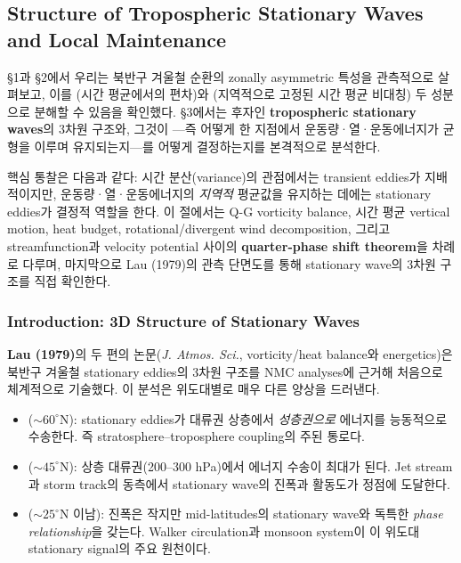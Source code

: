 \subsection{Structure of Tropospheric Stationary Waves and Local Maintenance}\label{subsec:ch06_stationary}

§1과 §2에서 우리는 북반구 겨울철 순환의 zonally asymmetric 특성을 관측적으로 살펴보고,
이를 (시간 평균에서의 편차)와 (지역적으로 고정된 시간 평균 비대칭)
두 성분으로 분해할 수 있음을 확인했다.
§3에서는 후자인 \textbf{tropospheric stationary waves}의 3차원 구조와,
그것이 ---즉 어떻게 한 지점에서 운동량·열·운동에너지가 균형을 이루며 유지되는지---를
어떻게 결정하는지를 본격적으로 분석한다.

핵심 통찰은 다음과 같다: 시간 분산(variance)의 관점에서는 transient eddies가 지배적이지만,
운동량·열·운동에너지의 \emph{지역적} 평균값을 유지하는 데에는 stationary eddies가 결정적 역할을 한다.
이 절에서는 Q-G vorticity balance, 시간 평균 vertical motion, heat budget,
rotational/divergent wind decomposition, 그리고 streamfunction과 velocity potential 사이의
\textbf{quarter-phase shift theorem}을 차례로 다루며,
마지막으로 Lau (1979)의 관측 단면도를 통해 stationary wave의 3차원 구조를 직접 확인한다.


\subsubsection{Introduction: 3D Structure of Stationary Waves}

\textbf{Lau (1979)}의 두 편의 논문(\textit{J. Atmos. Sci.}, vorticity/heat balance와 energetics)은
북반구 겨울철 stationary eddies의 3차원 구조를 NMC analyses에 근거해 처음으로 체계적으로 기술했다.
이 분석은 위도대별로 매우 다른 양상을 드러낸다.

\begin{itemize}
  \item {} ($\sim 60^\circ$N): stationary eddies가 대류권 상층에서 \emph{성층권으로}
        에너지를 능동적으로 수송한다. 즉 stratosphere--troposphere coupling의 주된 통로다.
  \item {} ($\sim 45^\circ$N): 상층 대류권(200--300 hPa)에서 에너지 수송이 최대가 된다.
        Jet stream과 storm track의 동측에서 stationary wave의 진폭과 활동도가 정점에 도달한다.
  \item {} ($\sim 25^\circ$N 이남): 진폭은 작지만 mid-latitudes의 stationary wave와
        독특한 \emph{phase relationship}을 갖는다. Walker circulation과 monsoon system이
        이 위도대 stationary signal의 주요 원천이다.
\end{itemize}

